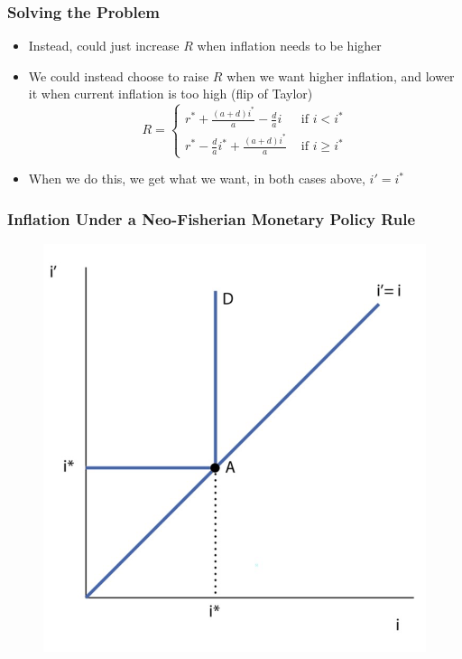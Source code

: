 \documentclass{beamer}
\begin{document}
\begin{frame}
\frametitle[alignment=center]{Solving the Problem}
\begin{itemize}
\item Instead, could just increase $R$ when inflation needs to be higher
\bigskip
\item We could instead choose to raise $R$ when we want higher inflation, and lower it when current inflation is too high (flip of Taylor)
\bigskip
$$R = \begin{cases}r^*+\frac{(a+d)i^*}{a}-\frac{d}{a}i & \text{ if $i< i^*$} \\
r^*-\frac{d}{a}i^*+\frac{(a+d)i^*}{a} & \text{ if $i\geq i^*$}
\end{cases}$$
\item When we do this, we get what we want, in both cases above, $i'=i^*$
\end{itemize}
\end{frame}

\begin{frame}
\frametitle[alignment=center]{Inflation Under a Neo-Fisherian Monetary Policy Rule}
\begin{figure}
\centering
\includegraphics[scale=0.5]{Figures/W_Fig_15pt13.png}
\end{figure}
\end{frame}
\end{document}
